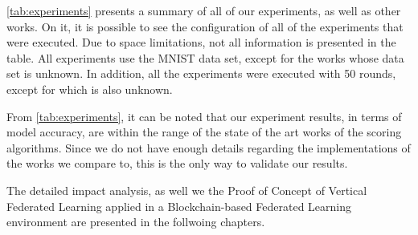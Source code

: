 \autoref{tab:experiments} presents a summary of all of our experiments, as well as other works. On it, it is possible to see the configuration of all of the experiments that were executed. Due to space limitations, not all information is presented in the table. All experiments use the MNIST data set, except for the works \cite{10.48550/arxiv.2007.03856, 10.48550/arxiv.2011.07516} whose data set is unknown. In addition, all the experiments were executed with 50 rounds, except for \cite{9170559} which is also unknown.

From \autoref{tab:experiments}, it can be noted that our experiment results, in terms of model accuracy, are within the range of the state of the art works of the scoring algorithms. Since we do not have enough details regarding the implementations of the works we compare to, this is the only way to validate our results.

The detailed impact analysis, as well we the Proof of Concept of Vertical Federated Learning applied in a Blockchain-based Federated Learning environment are presented in the follwoing chapters.


